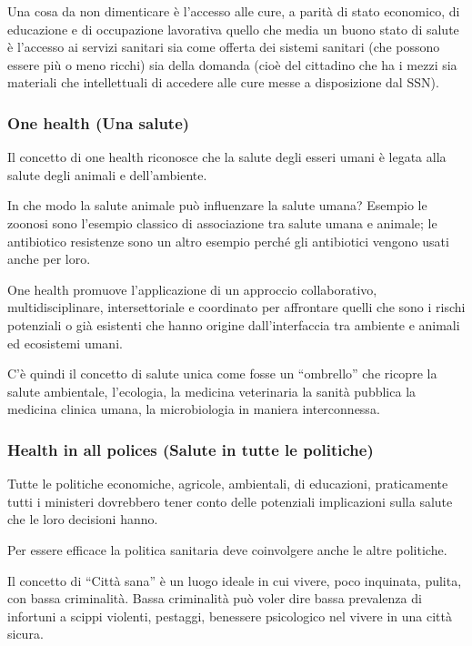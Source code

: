Una cosa da non dimenticare è l'accesso alle cure, a parità di stato
economico, di educazione e di occupazione lavorativa quello che media un
buono stato di salute è l'accesso ai servizi sanitari sia come offerta
dei sistemi sanitari (che possono essere più o meno ricchi) sia della
domanda (cioè del cittadino che ha i mezzi sia materiali che
intellettuali di accedere alle cure messe a disposizione dal SSN).

\subsubsection{One health (Una salute)}

Il concetto di one health riconosce che la salute degli esseri umani è
legata alla salute degli animali e dell'ambiente.

In che modo la salute animale può influenzare la salute umana? Esempio
le zoonosi sono l'esempio classico di associazione tra salute umana e
animale; le antibiotico resistenze sono un altro esempio perché gli
antibiotici vengono usati anche per loro.

One health promuove l'applicazione di un approccio collaborativo,
multidisciplinare, intersettoriale e coordinato per affrontare quelli
che sono i rischi potenziali o già esistenti che hanno origine
dall'interfaccia tra ambiente e animali ed ecosistemi umani.

C'è quindi il concetto di salute unica come fosse un ``ombrello'' che
ricopre la salute ambientale, l'ecologia, la medicina veterinaria la
sanità pubblica la medicina clinica umana, la microbiologia in maniera
interconnessa.

\subsubsection{Health in all polices (Salute in tutte le politiche)}

Tutte le politiche economiche, agricole, ambientali, di educazioni,
praticamente tutti i ministeri dovrebbero tener conto delle potenziali
implicazioni sulla salute che le loro decisioni hanno.

Per essere efficace la politica sanitaria deve coinvolgere anche le
altre politiche.

Il concetto di ``Città sana'' è un luogo ideale in cui vivere, poco
inquinata, pulita, con bassa criminalità. Bassa criminalità può voler
dire bassa prevalenza di infortuni a scippi violenti, pestaggi,
benessere psicologico nel vivere in una città sicura.


